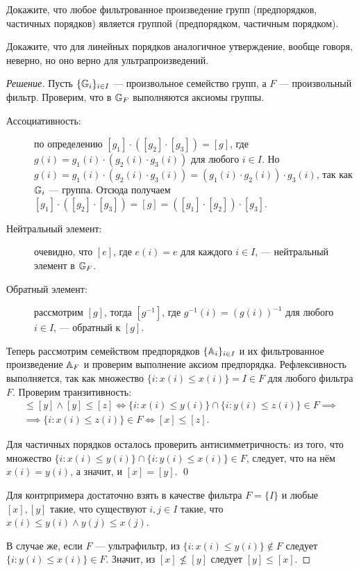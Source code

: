     \begin{problem}[2]
        Докажите, что любое фильтрованное произведение групп (предпорядков, частичных порядков) является группой (предпорядком, частичным порядком).

        Докажите, что для линейных порядков аналогичное утверждение, вообще говоря, неверно, но оно верно для ультрапроизведений.
    \end{problem}
    \begin{proof}[Решение]
        Пусть \(\{\mathbb{G}_i\}_{i \in I}\) --- произвольное семейство групп, а \(F\) --- произвольный фильтр. Проверим, что в \(\mathbb{G}_F\) выполняются аксиомы группы.
        \begin{description}
            \item[Ассоциативность:] по определению \([g_1] \cdot ([g_2] \cdot [g_3]) = [g]\), где \(g(i) = g_1(i) \cdot (g_2(i) \cdot g_3(i))\) для любого \(i \in I\). Но \(g(i) = g_1(i) \cdot (g_2(i) \cdot g_3(i)) = (g_1(i) \cdot g_2(i)) \cdot g_3(i)\), так как \(\mathbb{G}_i\) --- группа. Отсюда получаем \([g_1] \cdot ([g_2] \cdot [g_3]) = [g] = ([g_1] \cdot [g_2]) \cdot [g_3]\).
            \item[Нейтральный элемент:] очевидно, что \([e]\), где \(e(i) = e\) для каждого \(i \in I\), --- нейтральный элемент в \(\mathbb{G}_F\).
            \item[Обратный элемент:] рассмотрим \([g]\), тогда \([g^{-1}]\), где \(g^{-1}(i) = (g(i))^{-1}\) для любого \(i \in I\), --- обратный к \([g]\). 
        \end{description}

        Теперь рассмотрим семейством предпорядков \(\{\mathbb{A}_i\}_{i \in I}\) и их фильтрованное произведение \(\mathbb{A}_F\) и проверим выполнение аксиом предпорядка. Рефлексивность выполняется, так как множество \(\{i : x(i) \leqslant x(i)\} = I \in F\) для любого фильтра \(F\). Проверим транзитивность:
        \begin{multline*}
            [x] \leqslant [y] \land [y] \leqslant [z] \iff \{i : x(i) \leqslant y(i)\} \cap \{i : y(i) \leqslant z(i)\} \in F \implies \\
            \implies \{i : x(i) \leqslant z(i)\} \in F \iff [x] \leqslant [z].
        \end{multline*}

        Для частичных порядков осталось проверить антисимметричность: из того, что множество \(\{i : x(i) \leqslant y(i)\} \cap \{i : y(i) \leqslant x(i)\} \in F\), следует, что на нём \(x(i) = y(i)\), а значит, и \([x] = [y]\). \qed

        Для контрпримера достаточно взять в качестве фильтра \(F = \{I\}\) и любые \([x], [y]\) такие, что существуют \(i, j \in I\) такие, что \(x(i) \leqslant y(i) \land y(j) \leqslant x(j)\).
        
        В случае же, если \(F\) --- ультрафильтр, из \(\{i : x(i) \leqslant y(i)\} \not \in F\) следует \(\{i : y(i) \leqslant x(i)\} \in F\). Значит, из \([x] \not\leqslant [y]\) следует \([y] \leqslant [x]\).
    \end{proof}

